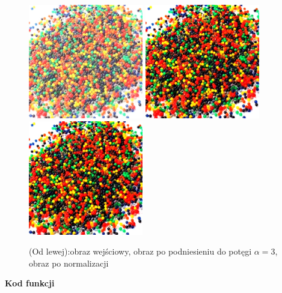 \documentclass[magisterska,openany]{pracadypl}
\begin{document}
\begin{figure}[h]
\centering
\includegraphics[width=5cm, height=5cm]{orgi/RGBkulki.jpg}
\includegraphics[width=5cm, height=5cm]{4_6/powRGB2.jpg}
\includegraphics[width=5cm, height=5cm]{4_6/npowRGB2.jpg}
\caption{(Od lewej):obraz wejściowy, obraz po podniesieniu do potęgi $\alpha=3$,
obraz po normalizacji}
\end{figure}

\newpage
\textbf{\Large Kod funkcji}
   
\end{document}
